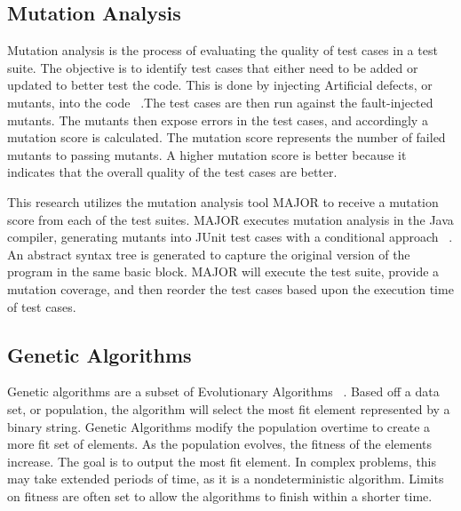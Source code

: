 \documentclass[conference]{IEEEtran}
\begin{document}
\subsection{Mutation Analysis}
Mutation analysis is the process of evaluating the quality of test cases in a test suite. The objective is to identify test cases that either need to be added or updated to better test the code. This is done by injecting Artificial defects, or mutants, into the code ~\cite{Fraser:2010:MGU:1831708.1831728}.The test cases are then run against the fault-injected mutants. The mutants then expose errors in the test cases, and accordingly a mutation score is calculated. The mutation score represents the number of failed mutants to passing mutants. A higher mutation score is better because it indicates that the overall quality of the test cases are better. 

This research utilizes the mutation analysis tool MAJOR to receive a mutation score from each of the test suites. MAJOR executes mutation analysis in the Java compiler, generating mutants into JUnit test cases with a conditional approach ~\cite{MAJOR:Just:2011}. An abstract syntax tree is generated to capture the original version of the program in the same basic block. MAJOR will execute the test suite, provide a mutation coverage, and then reorder the test cases based upon the execution time of test cases. 

\subsection{Genetic Algorithms}
Genetic algorithms are a subset of Evolutionary Algorithms ~\cite{Pandey:2012:GAC:2381716.2381766}.  Based off a data set, or population, the algorithm will select the most fit element represented by a binary string. Genetic Algorithms modify the population overtime to create a more fit set of elements. As the population evolves, the fitness of the elements increase. The goal is to output the most fit element. In complex problems, this may take extended periods of time, as it is a nondeterministic algorithm. Limits on fitness are often set to allow the algorithms to finish within a shorter time.
\end{document}

